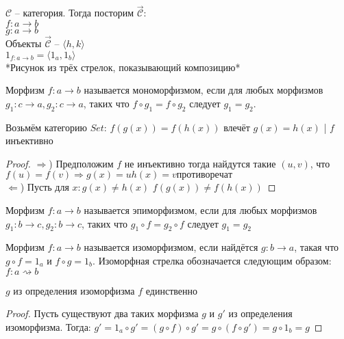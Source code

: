 $\mathcal{C}$ -- категория. Тогда посторим $\overrightarrow{\mathcal{C}}$: \\
$f\colon a \to b$ \\
$g\colon a \to b$ \\

Объекты $\overrightarrow{\mathcal{C}}$ -- $\langle h, k \rangle$ \\
$1_{f\colon a \to b} = \langle 1_a, 1_b \rangle$ \\

*Рисунок из трёх стрелок, показывающий композицию* \\

\begin{defn}
  Морфизм $f \colon a \to b$ называется мономорфизмом, если для любых морфизмов
  $g_1 \colon c \to a, g_2 \colon c \to a$, таких что $f \circ g_1 = f \circ g_2$
  следует $g_1 = g_2$.
\end{defn}

\begin{thm}
  Возьмём категорию $Set$: $f(g(x)) = f(h(x))$ влечёт $g(x)=h(x)$ | $f$ инъективно
\end{thm}
\begin{proof}
  $\Rightarrow$) Предположим $f$ не инъективно тогда найдутся такие $(u, v)$, что $f(u) = f(v)
  \Rightarrow g(x) = u h(x) = v противоречат$ \\
  $\Leftarrow$) Пусть для $x: g(x) \ne h(x)$ $f(g(x)) \ne f(h(x))$
\end{proof}

\begin{defn}
  Морфизм $f \colon a \to b$ называется эпиморфизмом, если для любых морфизмов
  $g_1 \colon b \to c, g_2 \colon b \to c$, таких что $g_1 \circ f = g_2 \circ f$
  следует $g_1 = g_2$
\end{defn}

\begin{defn}
  Морфизм $f \colon a \to b$ называется изоморфизмом, если найдётся
  $g \colon b \to a$, такая что $g \circ f = 1_a$ и $f \circ g = 1_b$.
  Изоморфная стрелка обозначается следующим образом:
  $f \colon a \rightsquigarrow b$
\end{defn}

\begin{stmt}
  $g$ из определения изоморфизма $f$ единственно
\end{stmt}
\begin{proof}
  Пусть существуют два таких морфизма $g$ и $g'$ из определения изоморфизма. Тогда:
  $g' = 1_a \circ g' = (g \circ f) \circ g' = g \circ (f \circ g') = g \circ 1_b = g$
\end{proof}

